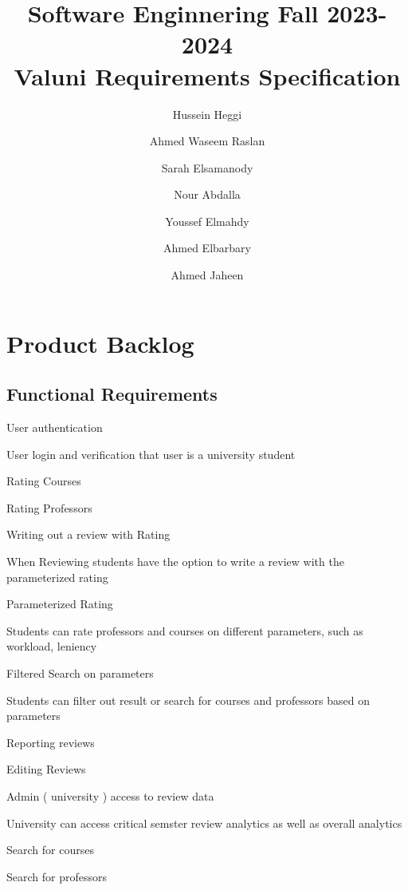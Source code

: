 \documentclass{article}
\title{Software Enginnering Fall 2023-2024 \\ Valuni Requirements Specification}
\author{  
Hussein Heggi 	\and
Ahmed Waseem Raslan 	\and
Sarah Elsamanody 	\and
Nour Abdalla 	\and
Youssef Elmahdy	\and
Ahmed Elbarbary	\and 
Ahmed Jaheen}
\begin{document}
\maketitle 

\break


\section{Product Backlog}

\subsection{Functional Requirements}

	\quad User authentication 
	\vspace{-0.2cm}

	\qquad \scriptsize User login and verification that user is a university student \normalsize

	\quad Rating Courses

	\quad Rating Professors

	\quad Writing out a review with Rating
	\vspace{-0.2cm}

	\qquad \scriptsize When Reviewing students have the option to write a review with the parameterized rating \normalsize

	\quad Parameterized Rating
	\vspace{-0.2cm}

	\qquad \scriptsize Students can rate professors and courses on different parameters, such as workload, leniency \normalsize

	\quad Filtered Search on parameters 
	\vspace{-0.2cm}

	\qquad \scriptsize Students can filter out result or search for courses and professors based on parameters \normalsize

	\quad Reporting reviews

	\quad Editing Reviews

	\quad Admin ( university ) access to review data 
	\vspace{-0.2cm} 

	\qquad \scriptsize University can access critical semster review analytics as well as overall analytics \normalsize

	\quad Search for courses 

	\quad Search for professors 
\end{document}
